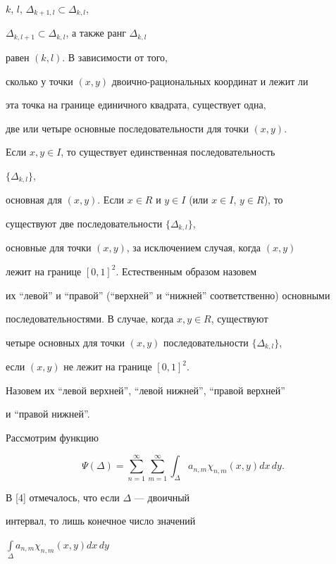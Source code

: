 $k$, $l$, $\Delta_{k+1,l}\subset \Delta _{k,l}$,


$\Delta_{k,l+1}\subset \Delta _{k,l}$, а также ранг $\Delta _{k,l}$


равен $(k,l)$. В зависимости от того,


сколько у точки $(x,y)$ двоично-рациональных координат и лежит ли 


эта точка на границе единичного квадрата, существует одна, 


две или четыре основные последовательности для точки $(x,y)$. 


Если $x,y \in I$, то существует единственная последовательность


$\{ \Delta _{k,l}\}$,


основная для $(x,y)$. Если $x\in R$ и $y\in I$ (или $x\in I$, $y\in R$), то


существуют две последовательности $\{ \Delta _{k,l}\} $,


основные для точки $(x,y)$, за исключением случая, когда $(x,y)$


лежит на границе $[0,1]^{2}$. Естественным образом назовем


их ``левой'' и ``правой'' (``верхней'' и ``нижней'' соответственно) основными 


последовательностями. В случае, когда $x,y\in R$, существуют


четыре основных для точки $(x,y)$ последовательности $\{ \Delta _{k,l}\} $,


если $(x,y)$ не лежит на границе $[0,1]^{2}$.


Назовем их ``левой верхней'', ``левой нижней'', ``правой верхней''


и ``правой нижней''.





Рассмотрим функцию 


\begin{equation}


\Psi (\Delta)=\sum\limits_{n=1}^{\infty }\sum\limits_{m=1}^{\infty }


\int_{\Delta }a_{n,m}\chi_{n,m}(x,y)dx\,dy.


\end{equation}





В [4] отмечалось, что если $\Delta $ --- двоичный


интервал, то лишь конечное число значений 


$\int\limits _{\Delta }a_{n,m}\chi _{n,m}(x,y)dx\,dy$


